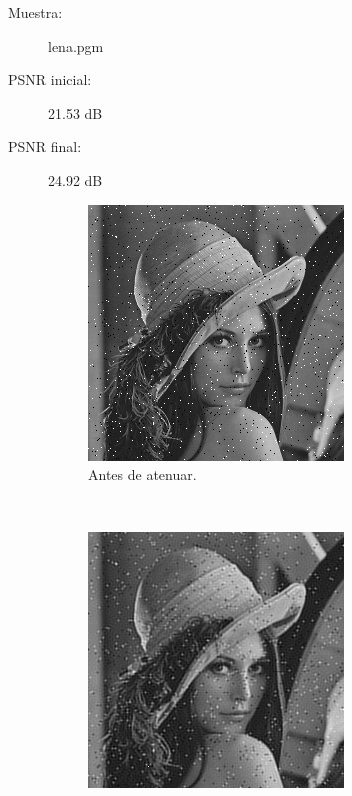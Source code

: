 \documentclass[a4paper,10pt,twoside]{article}
\begin{document}
\begin{description}
  \item[Muestra:] lena.pgm
  \item[PSNR inicial:] 21.53 dB
  \item[PSNR final:] 24.92 dB
\end{description}

\begin{figure}[H]
  \centering
  \begin{subfigure}[b]{0.45\textwidth}
    \centering
    \includegraphics[width=\textwidth]{graficos/lena_impulsivo_muestra.png}    
    \caption{Antes de atenuar.}
  \end{subfigure}
  ~ 
  \begin{subfigure}[b]{0.45\textwidth}
    \centering
    \includegraphics[width=\textwidth]{graficos/lena_impulsivo_atenuar_muestra.png}

\end{subfigure}
\end{figure}
\end{document}
